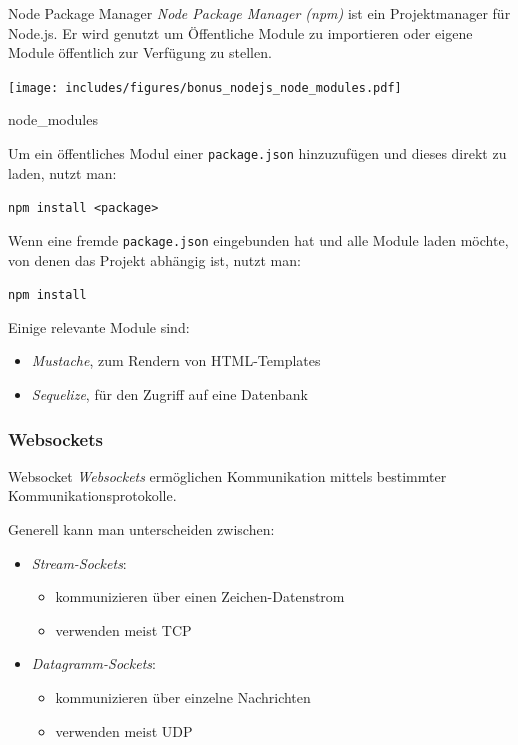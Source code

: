 \begin{defi}{Node Package Manager}
    \emph{Node Package Manager (npm)} ist ein Projektmanager für Node.js.
    Er wird genutzt um Öffentliche Module zu importieren oder eigene Module öffentlich zur Verfügung zu stellen.
\end{defi}

\begin{center}
    \texttt{[image: includes/figures/bonus\_nodejs\_node\_modules.pdf]}
\end{center}

\begin{bonus}{node\_modules}

    Um ein öffentliches Modul einer \texttt{package.json} hinzuzufügen und dieses direkt zu laden, nutzt man:

    \begin{center}
        \texttt{npm install <package>}
    \end{center}

    Wenn eine fremde \texttt{package.json} eingebunden hat und alle Module laden möchte, von denen das Projekt abhängig ist, nutzt man:
    \begin{center}
        \texttt{npm install}
    \end{center}

    Einige relevante Module sind:
    \begin{itemize}
        \item \emph{Mustache}, zum Rendern von HTML-Templates
        \item \emph{Sequelize}, für den Zugriff auf eine Datenbank
    \end{itemize}
\end{bonus}

\subsubsection{Websockets}

\begin{defi}{Websocket}
    \emph{Websockets} ermöglichen Kommunikation mittels bestimmter Kommunikationsprotokolle.

    Generell kann man unterscheiden zwischen:
    \begin{itemize}
        \item \emph{Stream-Sockets}:
              \begin{itemize}
                  \item kommunizieren über einen Zeichen-Datenstrom
                  \item verwenden meist TCP
              \end{itemize}
        \item \emph{Datagramm-Sockets}:
              \begin{itemize}
                  \item kommunizieren über einzelne Nachrichten
                  \item verwenden meist UDP
              \end{itemize}
    \end{itemize}
\end{defi}

